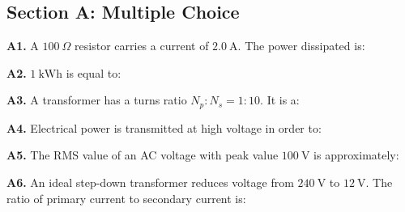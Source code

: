 \newpage
\begin{exercisebox}[24]

\subsection*{Section A: Multiple Choice}

\textbf{A1.} A $100\ \Omega$ resistor carries a
current of $2.0\ \text{A}$. The power dissipated is:


\vspace{0.4cm}

\textbf{A2.} $1\ \text{kWh}$ is equal to:


\vspace{0.4cm}

\textbf{A3.} A transformer has a turns ratio
$N_p:N_s = 1:10$. It is a:


\vspace{0.4cm}

\textbf{A4.} Electrical power is transmitted at
high voltage in order to:


\vspace{0.4cm}

\textbf{A5.} The RMS value of an AC voltage with
peak value $100\ \text{V}$ is approximately:


\vspace{0.4cm}

\textbf{A6.} An ideal step-down transformer reduces
voltage from $240\ \text{V}$ to $12\ \text{V}$.
The ratio of primary current to secondary current is:


\end{exercisebox}
